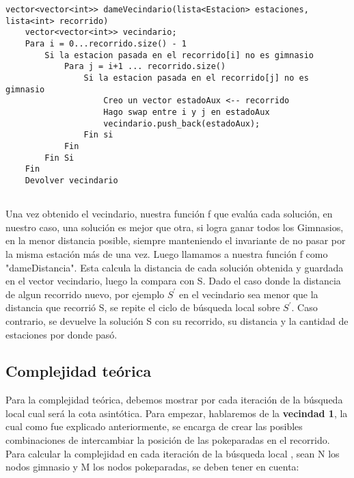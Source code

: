     \begin{codesnippet}
    \begin{verbatim}
vector<vector<int>> dameVecindario(lista<Estacion> estaciones, lista<int> recorrido)
    vector<vector<int>> vecindario;
    Para i = 0...recorrido.size() - 1
        Si la estacion pasada en el recorrido[i] no es gimnasio
            Para j = i+1 ... recorrido.size()
                Si la estacion pasada en el recorrido[j] no es gimnasio
                    Creo un vector estadoAux <-- recorrido
                    Hago swap entre i y j en estadoAux
                    vecindario.push_back(estadoAux);
                Fin si
            Fin
        Fin Si
    Fin
    Devolver vecindario
 
    \end{verbatim}
    \end{codesnippet}

    Una vez obtenido el vecindario, nuestra función f que evalúa cada solución, en nuestro caso, una solución es mejor que otra, si logra ganar todos los Gimnasios, en la menor distancia posible, siempre manteniendo el invariante de no pasar por la misma estación más de una vez. Luego llamamos a nuestra función f como "dameDistancia". Esta calcula la distancia de cada solución obtenida y guardada en el vector vecindario, luego la compara con S. Dado el caso donde la distancia de algun recorrido nuevo, por ejemplo $S^{'}$ en el vecindario sea menor que la distancia que recorrió S, se repite el ciclo de búsqueda local sobre $S^{'}$. Caso contrario, se devuelve la solución S con su recorrido, su distancia y la cantidad de estaciones por donde pasó.

   
    \subsection{Complejidad teórica}
        Para la complejidad teórica, debemos mostrar por cada iteración de la búsqueda local cual será la cota asintótica. Para empezar, hablaremos de la  \textbf{vecindad 1}, la cual como fue explicado anteriormente, se encarga de crear las posibles combinaciones de intercambiar la posición de las pokeparadas en el recorrido. Para calcular la complejidad en cada iteración de la búsqueda local , sean N los nodos gimnasio y M los nodos pokeparadas, se deben tener en cuenta:

